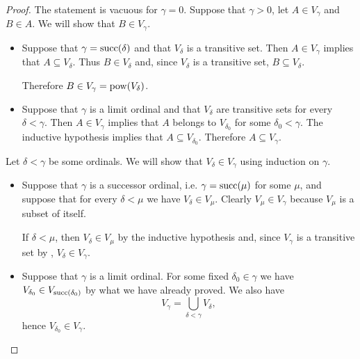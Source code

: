 \begin{proof}
   The statement is vacuous for \( \gamma = 0 \). Suppose that \( \gamma > 0 \), let \( A \in V_\gamma \) and \( B \in A \). We will show that \( B \in V_\gamma \).
  \begin{itemize}
    \item Suppose that \( \gamma = \operatorname{succ}(\delta) \) and that \( V_\delta \) is a transitive set. Then \( A \in V_\gamma \) implies that \( A \subseteq V_\delta \). Thus \( B \in V_\delta \) and, since \( V_\delta \) is a transitive set, \( B \subseteq V_\delta \).

    Therefore \( B \in V_\gamma = \operatorname{pow}(V_\delta) \).

    \item Suppose that \( \gamma \) is a limit ordinal and that \( V_\delta \) are transitive sets for every \( \delta < \gamma \). Then \( A \in V_\gamma \) implies that \( A \) belongs to \( V_{\delta_0} \) for some \( \delta_0 < \gamma \). The inductive hypothesis implies that \( A \subseteq V_{\delta_0} \). Therefore \( A \subseteq V_\gamma \).
  \end{itemize}

   Let \( \delta < \gamma \) be some ordinals. We will show that \( V_\delta \in V_\gamma \) using induction on \( \gamma \).
  \begin{itemize}
    \item Suppose that \( \gamma \) is a successor ordinal, i.e. \( \gamma = \operatorname{succ}(\mu) \) for some \( \mu \), and suppose that for every \( \delta < \mu \) we have \( V_\delta \in V_\mu \). Clearly \( V_\mu \in V_\gamma \) because \( V_\mu \) is a subset of itself.

    If \( \delta < \mu \), then \( V_\delta \in V_\mu \) by the inductive hypothesis and, since \( V_\gamma \) is a transitive set by , \( V_\delta \in V_\gamma \).

    \item Suppose that \( \gamma \) is a limit ordinal. For some fixed \( \delta_0 \in \gamma \) we have \( V_{\delta_0} \in V_{\operatorname{succ}(\delta_0)} \) by what we have already proved. We also have
    \begin{equation*}
      V_\gamma
      =
      \bigcup_{\delta < \gamma} V_\delta,
    \end{equation*}
    hence \( V_{\delta_0} \in V_\gamma \).
  \end{itemize}


\end{proof}
